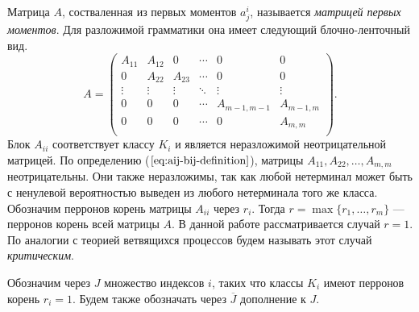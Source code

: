 \documentclass[12pt]{article}
\begin{document}
Матрица $A$, состваленная из первых моментов $a^i_j$, называется \textit{матрицей первых моментов}. Для разложимой грамматики она имеет следующий блочно-ленточный вид.
\begin{equation}
\label{eq:amatrix}
	A =
	\begin{pmatrix}
		A_{11} & A_{12} & 0      & \cdots & 0           & 0          \\
		0      & A_{22} & A_{23} & \cdots & 0           & 0          \\ 
		\vdots & \vdots & \vdots & \ddots & \vdots      & \vdots     \\
		0      & 0      & 0      & \cdots & A_{m-1,m-1} & A_{m-1, m} \\
		0      & 0      & 0      & \cdots & 0           & A_{m,m}    \\
	\end{pmatrix}.
\end{equation}
Блок $A_{ii}$ соответствует классу $K_i$ и является неразложимой неотрицательной матрицей. По определению ($\ref{eq:aij-bij-definition}$), матрицы $A_{11}, A_{22}, \ldots, A_{m,m}$ неотрицательны. Они также неразложимы, так как любой нетерминал может быть с ненулевой вероятностью выведен из любого нетерминала того же класса. Обозначим перронов корень \cite{gantmaher-matrix-theory} матрицы $A_{ii}$ через $r_i$. Тогда $r = \max\{r_1, \ldots, r_m\}$ --- перронов корень всей матрицы $A$. В данной работе рассматривается случай $r = 1$. По аналогии с теорией ветвящихся процессов \cite{sevast-processes} будем называть этот случай \textit{критическим}.

Обозначим через $J$ множество индексов $i$, таких что классы $K_i$ имеют перронов корень $r_i = 1$. Будем также обозначать через $\overline{J}$ дополнение к $J$.
\end{document}
